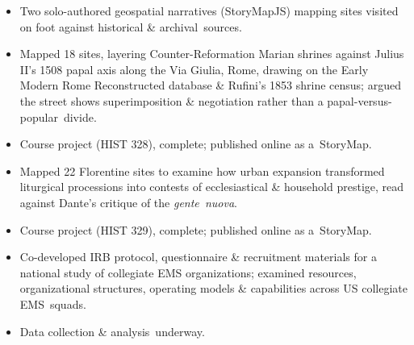 \begin{itemize}
  \item Two solo-authored geospatial narratives (StoryMapJS) mapping sites visited on foot against historical \& \cvkeep{}archival~\cvlast{}sources.\cvkeepend{}
\end{itemize}
\begin{itemize}
  \item Mapped 18 sites, layering Counter-Reformation Marian shrines against Julius II's 1508 papal axis along the Via Giulia, Rome, drawing on the Early Modern Rome Reconstructed database \& Rufini's 1853 shrine census; argued the street shows superimposition \& negotiation rather than a \cvkeep{}papal-versus-popular~\cvlast{}divide.\cvkeepend{}
  \item Course project (HIST 328), complete; published online as \cvkeep{}a~\cvlast{}StoryMap.\cvkeepend{}
\end{itemize}
\begin{itemize}
  \item Mapped 22 Florentine sites to examine how urban expansion transformed liturgical processions into contests of ecclesiastical \& household prestige, read against Dante's critique of the \cvkeep{}\textit{gente~\cvlast{}nuova}.\cvkeepend{}
  \item Course project (HIST 329), complete; published online as \cvkeep{}a~\cvlast{}StoryMap.\cvkeepend{}
\end{itemize}
\begin{itemize}
  \item Co-developed IRB protocol, questionnaire \& recruitment materials for a national study of collegiate EMS organizations; examined resources, organizational structures, operating models \& capabilities across US collegiate \cvkeep{}EMS~\cvlast{}squads.\cvkeepend{}
  \item Data collection \& \cvkeep{}analysis~\cvlast{}underway.\cvkeepend{}
\end{itemize}

